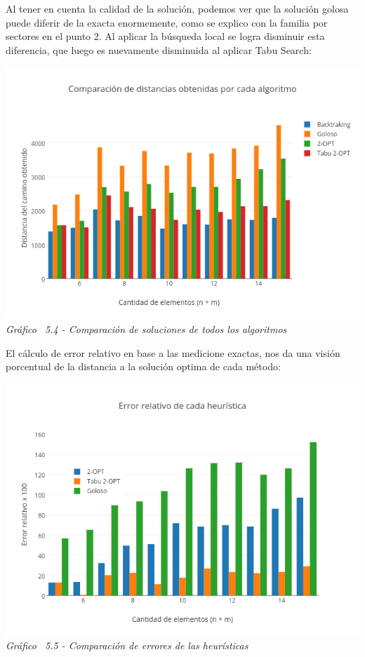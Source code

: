 Al tener en cuenta la calidad de la solución, podemos ver que la solución golosa puede diferir de la exacta enormemente, como se explico con la familia por sectores en el punto 2. Al aplicar la búsqueda local se logra disminuir esta diferencia, que luego es nuevamente disminuida al aplicar Tabu Search:

\vspace*{0.3cm} \vspace*{0.3cm}
  \begin{center}
 \includegraphics[scale=0.5]{./EJ5/comparativo.png}\\
 {\textit{Gráfico \ 5.4 - Comparaci\'on de soluciones de todos los algoritmos}}
  \end{center}
  \vspace*{0.3cm}
  
  
El cálculo de error relativo en base a las medicione exactas, nos da una visión porcentual de la distancia a la solución optima de cada método:
  
  \vspace*{0.3cm} \vspace*{0.3cm}
  \begin{center}
 \includegraphics[scale=0.5]{./EJ5/errorChico.png}\\
 {\textit{Gráfico \ 5.5 - Comparaci\'on de errores de las heurísticas}}
  \end{center}
  \vspace*{0.3cm}
  
